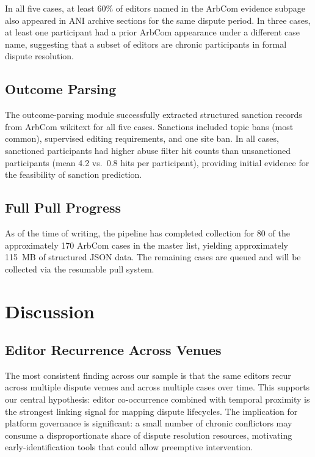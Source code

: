 \documentclass[conference]{IEEEtran}
\begin{document}
In all five cases, at least 60\% of editors named in the ArbCom evidence
subpage also appeared in ANI archive sections for the same dispute period. In
three cases, at least one participant had a prior ArbCom appearance under a
different case name, suggesting that a subset of editors are chronic
participants in formal dispute resolution.

\subsection{Outcome Parsing}

The outcome-parsing module successfully
extracted structured sanction records from ArbCom wikitext for all five cases. Sanctions included
topic bans (most common), supervised editing requirements, and one site ban.
In all cases, sanctioned participants had higher abuse filter hit counts than
unsanctioned participants (mean 4.2 vs.\ 0.8 hits per participant), providing
initial evidence for the feasibility of sanction prediction.

\subsection{Full Pull Progress}

As of the time of writing, the pipeline has completed collection for 80 of the
approximately 170 ArbCom cases in the master list, yielding approximately
115~MB of structured JSON data. The remaining cases are queued and will be
collected via the resumable pull system.

\section{Discussion}

\subsection{Editor Recurrence Across Venues}

The most consistent finding across our sample is that the same editors recur
across multiple dispute venues and across multiple cases over time. This supports
our central hypothesis: editor co-occurrence combined with temporal proximity
is the strongest linking signal for mapping dispute lifecycles. The implication
for platform governance is significant: a small number of chronic conflictors
may consume a disproportionate share of dispute resolution resources, motivating
early-identification tools that could allow preemptive intervention.
\end{document}
